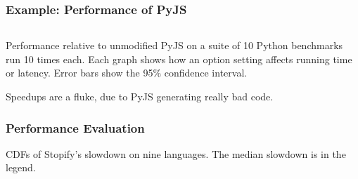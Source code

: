 \documentclass[8pt,pdf,handout]{beamer}
\begin{document}
\begin{frame}
\frametitle{Example: Performance of PyJS}

\begin{columns}

\begin{column}{0.45\textwidth}

\end{column}
\begin{column}{0.45\textwidth}

\end{column}

\end{columns}

Performance relative to unmodified PyJS on a suite of 10 Python benchmarks run
10 times each. Each graph shows how an option setting affects running time or
latency. Error bars show the 95\% confidence interval.

Speedups are a fluke, due to PyJS generating really bad code.

\end{frame}

\begin{frame}
\frametitle{Performance Evaluation}

\begin{center}
\end{center}

CDFs of Stopify's slowdown on nine languages. The median slowdown is in the
legend.

\end{frame}
\end{document}
